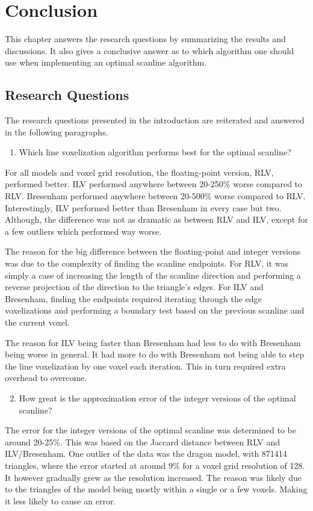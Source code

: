 \chapter{Conclusion}\label{cha:conclusion}
This chapter answers the research questions by summarizing the results and discussions.
It also gives a conclusive answer as to which algorithm one should use when implementing an optimal scanline algorithm.

\section{Research Questions}
The research questions presented in the introduction are reiterated and answered in the following paragraphs.

\begin{enumerate}
\item Which line voxelization algorithm performs best for the optimal scanline? 
\end{enumerate}
For all models and voxel grid resolution, the floating-point version, RLV, performed better.
ILV performed anywhere between 20-250\% worse compared to RLV.
Bresenham performed anywhere between 20-500\% worse compared to RLV.
Interestingly, ILV performed better than Bresenham in every case but two.
Although, the difference was not as dramatic as between RLV and ILV, except for a few outliers which performed way worse.

The reason for the big difference between the floating-point and integer versions was due to the complexity of finding the scanline endpoints.
For RLV, it was simply a case of increasing the length of the scanline direction and performing a reverse projection of the direction to the triangle's edges.
For ILV and Bresenham, finding the endpoints required iterating through the edge voxelizations and performing a boundary test based on the previous scanline and the current voxel.

The reason for ILV being faster than Bresenham had less to do with Bresenham being worse in general.
It had more to do with Bresenham not being able to step the line voxelization by one voxel each iteration.
This in turn required extra overhead to overcome.

\begin{enumerate}
\setcounter{enumi}{1}
\item How great is the approximation error of the integer versions of the optimal scanline?
\end{enumerate}
The error for the integer versions of the optimal scanline was determined to be around 20-25\%.
This was based on the Jaccard distance between RLV and ILV/Bresenham.
One outlier of the data was the dragon model, with 871414 triangles, where the error started at around 9\% for a voxel grid resolution of 128.
It however gradually grew as the resolution increased.
The reason was likely due to the triangles of the model being mostly within a single or a few voxels.
Making it less likely to cause an error.

